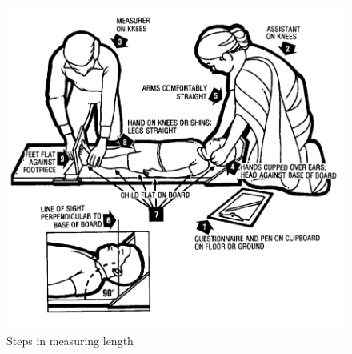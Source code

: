 \documentclass[
  12pt,
]{book}
\begin{document}
\begin{figure}

{\centering \includegraphics[width=12.46in]{images/length} 

}

\caption{Steps in measuring length}\label{fig:height07}
\end{figure}
\end{document}
